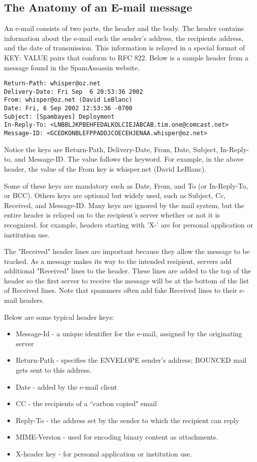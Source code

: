 \subsection*{The Anatomy of an E-mail message}

An e-mail consists of two parts, the header and the body.
The header contains information about the e-mail such
the sender's address, the recipients address, and the date of 
transmission.
This information is relayed in a special format 
of KEY: VALUE pairs that conform to RFC 822.
Below is a sample header from a message found in the
SpamAssassin website.

\begin{verbatim}
Return-Path: whisper@oz.net
Delivery-Date: Fri Sep  6 20:53:36 2002
From: whisper@oz.net (David LeBlanc)
Date: Fri, 6 Sep 2002 12:53:36 -0700
Subject: [Spambayes] Deployment
In-Reply-To: <LNBBLJKPBEHFEDALKOLCIEJABCAB.tim.one@comcast.net>
Message-ID: <GCEDKONBLEFPPADDJCOECEHJENAA.whisper@oz.net>
\end{verbatim}
                                                                               
Notice the keys are Return-Path, Delivery-Date, From, Date,
Subject, In-Reply-to, and Message-ID. 
The value follows the keyword.
For example, in the above header, the value of the From key 
is whisper\@oz.net (David LeBlanc).

Some of these keys are mandatory such as Date, From, and To (or 
In-Reply-To, or BCC).
Others keys are optional but widely used, such as Subject, Cc, 
Received, and Message-ID.
Many keys are ignored by the mail system, but the entire header 
is relayed on to the recipient's server whether or not it is 
recognized. 
for example, headers starting with 'X-' are for personal application 
or institution use.

The "Received" header lines are important because they allow
the message to be tracked. As a message makes its way to the
intended resipient, servers add additional "Received" lines
to the header. 
These lines are added to the top of the header so  the 
first server to receive the message will be at the bottom
of the list of Received lines.
Note that spammers often add fake Received lines to their
e-mail headers.

Below are some typical header keys:

\begin{itemize}
\item Message-Id - a unique identifier for the e-mail, assigned by the 
originating server 
\item Return-Path - specifies the ENVELOPE sender's address; 
         BOUNCED mail gets sent to this address.
\item Date - added by the e-mail client
\item CC - the recipients of a ``carbon copied" email
\item Reply-To - the address set by the sender to which the 
recipient can reply 
\item MIME-Version - used for encoding binary content as attachments.
\item X-header key - for personal application or institution use. 
\end{itemize}

